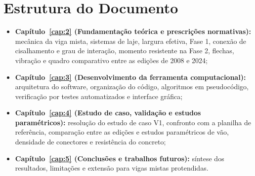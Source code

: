 \section{Estrutura do Documento}\label{sec:1.4}
\begin{itemize}
\item \textbf{Capítulo~\ref{cap:2} (Fundamentação teórica e prescrições normativas):} mecânica da viga mista, sistemas de laje, largura efetiva, Fase 1, conexão de cisalhamento e grau de interação, momento resistente na Fase 2, flechas, vibração e quadro comparativo entre as edições de 2008 e 2024;
\item \textbf{Capítulo~\ref{cap:3} (Desenvolvimento da ferramenta computacional):} arquitetura do software, organização do código, algoritmos em pseudocódigo, verificação por testes automatizados e interface gráfica;
\item \textbf{Capítulo~\ref{cap:4} (Estudo de caso, validação e estudos paramétricos):} resolução do estudo de caso V1, confronto com a planilha de referência, comparação entre as edições e estudos paramétricos de vão, densidade de conectores e resistência do concreto;
\item \textbf{Capítulo~\ref{cap:5} (Conclusões e trabalhos futuros):} síntese dos resultados, limitações e extensão para vigas mistas protendidas.
\end{itemize}
